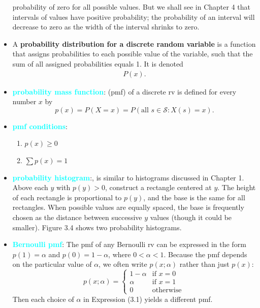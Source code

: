 \documentclass{report}
\begin{document}
\begin{itemize}
probability of zero for all possible values. But we shall see in Chapter 4 that intervals of values have positive probability; the probability of an interval will decrease
to zero as the width of the interval shrinks to zero.
\item 
    A \textbf{probability distribution for a discrete random variable} is a function that assigns probabilities to each possible value of the variable, such that the sum of all assigned probabilities equals 1. It is denoted 
    \begin{align*}
        P(x)
    .\end{align*}
    \item \textbf{\textcolor{cyan}{probability mass function}}: (pmf) of a discrete rv is defined for every number \( x \) by
    \[
    p(x) = P(X = x) = P(\text{all } s \in \mathcal{S} : X(s) = x).
    \]
\item \textbf{\textcolor{cyan}{pmf conditions}}:
    \begin{enumerate}
        \item $p(x)  \geq 0 $
        \item $\sum p(x) = 1 $
    \end{enumerate}
    \item \textbf{\textcolor{cyan}{probability histogram}}:, is similar to histograms discussed in Chapter 1. Above each \( y \) with \( p(y) > 0 \), construct a rectangle centered at \( y \). The height of each rectangle is proportional to \( p(y) \), and the base is the same for all rectangles. When possible values are equally spaced, the base is frequently chosen as the distance between successive \( y \) values (though it could be smaller). Figure 3.4 shows two probability histograms.
        \bigbreak \noindent 
    \item \textbf{\textcolor{cyan}{Bernoulli pmf}}: The pmf of any Bernoulli rv can be expressed in the form \( p(1) = \alpha \) and \( p(0) = 1 - \alpha \), where \( 0 < \alpha < 1 \). Because the pmf depends on the particular value of \( \alpha \), we often write \( p(x; \alpha) \) rather than just \( p(x) \):
        \[
            p(x; \alpha) = 
            \begin{cases} 
                1 - \alpha & \text{if } x = 0 \\
                \alpha & \text{if } x = 1 \quad \tag{3.1} \\
                0 & \text{otherwise}
            \end{cases}
        \]
        Then each choice of \( \alpha \) in Expression (3.1) yields a different pmf.

\end{itemize}
\end{document}
